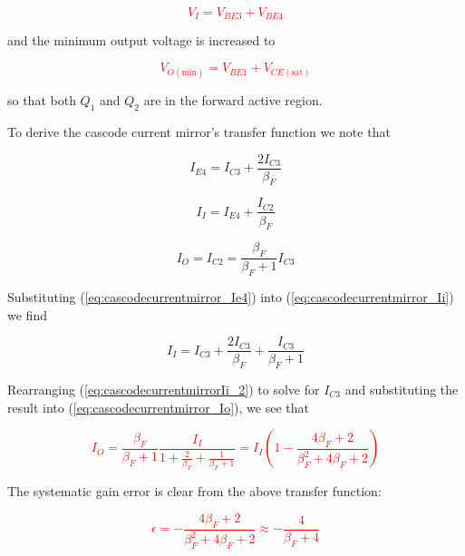 \textcolor{red}{
\begin{equation}
V_{I} = V_{BE3} + V_{BE4}
\end{equation}
}

and the minimum output voltage is increased to

\textcolor{red}{
\begin{equation}
V_{O(\text{min})} = V_{BE1} + V_{CE(\text{sat})}
\end{equation}
}

so that both $Q_1$ and $Q_2$ are in the forward active region.

To derive the cascode current mirror's transfer function we note that

\begin{equation}
I_{E4} = I_{C3}+\frac{2I_{C3}}{\beta_{F}}
\label{eq:cascodecurrentmirror_Ie4}
\end{equation}

\begin{equation}
I_{I} = I_{E4}+\frac{I_{C2}}{\beta_{F}}
\label{eq:cascodecurrentmirror_Ii}
\end{equation}

\begin{equation}
I_{O} = I_{C2} = \frac{\beta_{F}}{\beta_{F} + 1}I_{C3}
\label{eq:cascodecurrentmirror_Io}
\end{equation}

Substituting (\ref{eq:cascodecurrentmirror_Ie4}) into (\ref{eq:cascodecurrentmirror_Ii}) we find

\begin{equation}
I_{I} = I_{C3} + \frac{2I_{C3}}{\beta_{F}} + \frac{I_{C3}}{\beta_{F} + 1}
\label{eq:cascodecurrentmirrorIi_2}
\end{equation}

Rearranging (\ref{eq:cascodecurrentmirrorIi_2}) to solve for $I_{C3}$ and substituting the result into (\ref{eq:cascodecurrentmirror_Io}), we see that

\textcolor{red}{
\begin{equation}
I_{O} = \frac{\beta_{F}}{\beta_{F} + 1}\frac{I_{I}}{1+ \frac{2}{\beta_{F}} + \frac{1}{\beta_{F} + 1}} = I_{I}\left(1-\frac{4\beta_{F} + 2}{\beta_{F}^{2} + 4\beta_{F} + 2}\right)
\end{equation}
}

The systematic gain error is clear from the above transfer function:

\textcolor{red}{
\begin{equation}
\epsilon = -\frac{4\beta_{F} +  2}{\beta_{F}^{2} + 4\beta_{F} + 2} \approx -\frac{4}{\beta_{F} + 4}
\end{equation}
}

